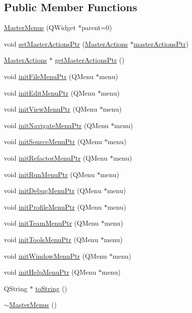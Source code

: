 \subsection*{Public Member Functions}
\begin{DoxyCompactItemize}
\item 
\hyperlink{class_master_menus_aee36f42f90844440ca2d43dc9b89ba9e}{Master\-Menus} (Q\-Widget $\ast$parent=0)
\item 
void \hyperlink{class_master_menus_a8953d8e2f0cab66bade92acc88fc04a6}{set\-Master\-Actions\-Ptr} (\hyperlink{class_master_actions}{Master\-Actions} $\ast$\hyperlink{class_master_menus_ab5ba9c46b8ad0e6eb11345e055ac469d}{master\-Actions\-Ptr})
\item 
\hyperlink{class_master_actions}{Master\-Actions} $\ast$ \hyperlink{class_master_menus_a391ce8b65f45a7e86461260d3d087d7c}{get\-Master\-Actions\-Ptr} ()
\item 
void \hyperlink{class_master_menus_aa8bc0efcd6904b557923f10135b4a6f0}{init\-File\-Menu\-Ptr} (Q\-Menu $\ast$menu)
\item 
void \hyperlink{class_master_menus_a3e332b9f2c0b1f6f8be1804edc3c3a4a}{init\-Edit\-Menu\-Ptr} (Q\-Menu $\ast$menu)
\item 
void \hyperlink{class_master_menus_a072f53ddc7e95bd21257fa094ee6c143}{init\-View\-Menu\-Ptr} (Q\-Menu $\ast$menu)
\item 
void \hyperlink{class_master_menus_a25403797f3c7541b131e622bf4e204bf}{init\-Navigate\-Menu\-Ptr} (Q\-Menu $\ast$menu)
\item 
void \hyperlink{class_master_menus_a9c2d338a75873eaac4914c7d148c109e}{init\-Source\-Menu\-Ptr} (Q\-Menu $\ast$menu)
\item 
void \hyperlink{class_master_menus_afc4b17087ccac9f443f26b7c881ce2bd}{init\-Refactor\-Menu\-Ptr} (Q\-Menu $\ast$menu)
\item 
void \hyperlink{class_master_menus_a8c9b587f8cfea5f8a49e4200adff5690}{init\-Run\-Menu\-Ptr} (Q\-Menu $\ast$menu)
\item 
void \hyperlink{class_master_menus_a395c8d54738fdb875d87b8f1b4f35285}{init\-Debug\-Menu\-Ptr} (Q\-Menu $\ast$menu)
\item 
void \hyperlink{class_master_menus_a126723492781a9da43f1c50cbfcb3876}{init\-Profile\-Menu\-Ptr} (Q\-Menu $\ast$menu)
\item 
void \hyperlink{class_master_menus_ab30cf69cf56d96abea4a201f6f89afb3}{init\-Team\-Menu\-Ptr} (Q\-Menu $\ast$menu)
\item 
void \hyperlink{class_master_menus_a70590f225ba732935b1b270e01e02270}{init\-Tools\-Menu\-Ptr} (Q\-Menu $\ast$menu)
\item 
void \hyperlink{class_master_menus_a65282d762db712fa3eb44cda48a2a52b}{init\-Window\-Menu\-Ptr} (Q\-Menu $\ast$menu)
\item 
void \hyperlink{class_master_menus_a9351214c416efafee85d1d7930c534f8}{init\-Help\-Menu\-Ptr} (Q\-Menu $\ast$menu)
\item 
Q\-String $\ast$ \hyperlink{class_master_menus_a79c579a497fb0ff4477b79990dcb19d5}{to\-String} ()
\item 
\hyperlink{class_master_menus_adce7fedd7b1732fc70ec7fcf3725cf22}{$\sim$\-Master\-Menus} ()
\end{DoxyCompactItemize}
